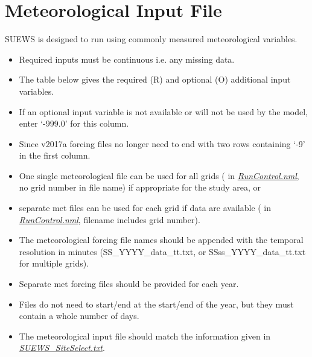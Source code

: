 \documentclass[letterpaper,10pt,english]{sphinxmanual}
\begin{document}
\section{Meteorological Input File}
\label{\detokenize{input_files/met_input::doc}}\label{\detokenize{input_files/met_input:meteorological-input-file}}
SUEWS is designed to run using commonly measured meteorological
variables.
\begin{itemize}
\item {} 
Required inputs must be continuous \textendash{} i.e.  any missing
data.

\item {} 
The table below gives the required (R) and optional (O) additional
input variables.

\item {} 
If an optional input variable is not available or will not be used by
the model, enter ‘-999.0’ for this column.

\item {} 
Since v2017a forcing files no longer need to end with two rows
containing ‘-9’ in the first column.

\item {} 
One single meteorological file can be used for all grids
( in {\hyperref[\detokenize{input_files/met_input:RunControl.nml}]{\emph{RunControl.nml}}}, no
grid number in file name) if appropriate for the study area, or

\item {} 
separate met files can be used for each grid if data are available
( in {\hyperref[\detokenize{input_files/met_input:RunControl.nml}]{\emph{RunControl.nml}}},
filename includes grid number).

\item {} 
The meteorological forcing file names should be appended with the
temporal resolution in minutes (SS\_YYYY\_data\_tt.txt, or
SSss\_YYYY\_data\_tt.txt for multiple grids).

\item {} 
Separate met forcing files should be provided for each year.

\item {} 
Files do not need to start/end at the start/end of the year, but they
must contain a whole number of days.

\item {} 
The meteorological input file should match the information given in
{\hyperref[\detokenize{input_files/met_input:SUEWS_SiteSelect.txt}]{\emph{SUEWS\_SiteSelect.txt}}}.


\end{itemize}
\end{document}
